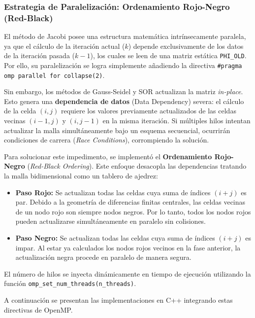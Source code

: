 \subsubsection{Estrategia de Paralelización: Ordenamiento Rojo-Negro (Red-Black)}
El método de Jacobi posee una estructura matemática intrínsecamente paralela, ya que el cálculo de la iteración actual ($k$) depende exclusivamente de los datos de la iteración pasada ($k-1$), los cuales se leen de una matriz estática \texttt{PHI\_OLD}. Por ello, su paralelización se logra simplemente añadiendo la directiva \texttt{\#pragma omp parallel for collapse(2)}.

Sin embargo, los métodos de Gauss-Seidel y SOR actualizan la matriz \textit{in-place}. Esto genera una \textbf{dependencia de datos} (Data Dependency) severa: el cálculo de la celda $(i, j)$ requiere los valores previamente actualizados de las celdas vecinas $(i-1, j)$ y $(i, j-1)$ en la misma iteración. Si múltiples hilos intentan actualizar la malla simultáneamente bajo un esquema secuencial, ocurrirán condiciones de carrera (\textit{Race Conditions}), corrompiendo la solución.

Para solucionar este impedimento, se implementó el \textbf{Ordenamiento Rojo-Negro} (\textit{Red-Black Ordering}). Este enfoque desacopla las dependencias tratando la malla bidimensional como un tablero de ajedrez:
\begin{itemize}
    \item \textbf{Paso Rojo:} Se actualizan todas las celdas cuya suma de índices $(i+j)$ es par. Debido a la geometría de diferencias finitas centrales, las celdas vecinas de un nodo rojo son siempre nodos negros. Por lo tanto, todos los nodos rojos pueden actualizarse simultáneamente en paralelo sin colisiones.
    \item \textbf{Paso Negro:} Se actualizan todas las celdas cuya suma de índices $(i+j)$ es impar. Al estar ya calculados los nodos rojos vecinos en la fase anterior, la actualización negra procede en paralelo de manera segura.
\end{itemize}

El número de hilos se inyecta dinámicamente en tiempo de ejecución utilizando la función \texttt{omp\_set\_num\_threads(n\_threads)}. 

A continuación se presentan las implementaciones en C++ integrando estas directivas de OpenMP.

